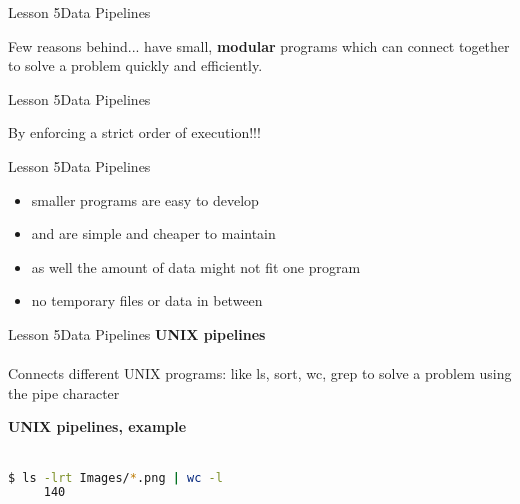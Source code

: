 \documentclass[aspectratio=1610]{beamer}
\begin{document}
\begin{frame}{Lesson 5}{Data Pipelines}
\Huge
\begin{center}
Few reasons behind... have small, \textbf{modular} programs which 
can connect together to solve a problem quickly and efficiently.
\end{center}
\end{frame}

\begin{frame}{Lesson 5}{Data Pipelines}
\Huge
\begin{center}
By \alert{enforcing} a strict \alert{order} of execution!!!
\end{center}
\end{frame}


\begin{frame}{Lesson 5}{Data Pipelines}
\huge
\begin{itemize}
    \item smaller programs are easy to develop 
    \item and are simple and cheaper to maintain
    \item as well the amount of data might not fit one program
    \item no temporary files or data in between
\end{itemize}
\end{frame}


\begin{frame}
\end{frame}



\begin{frame}{Lesson 5}{Data Pipelines}
\LARGE
\textbf{UNIX pipelines}\\~\\
Connects different UNIX programs: like ls, sort, wc, grep to solve a problem using the \text{\textbar} pipe character
\end{frame}


\begin{frame}
\end{frame}


\begin{frame}[fragile]
\LARGE
\textbf{UNIX pipelines, example}\\~\\
\begin{lstlisting}[language=sh]
$ ls -lrt Images/*.png | wc -l
     140
\end{lstlisting}
\end{frame}
\end{document}
